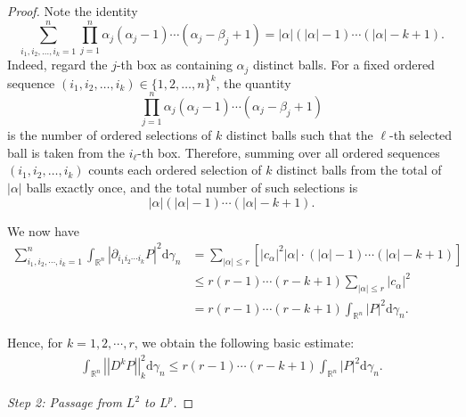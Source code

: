 \documentclass[12pt]{article}
\theoremstyle{plain}
\theoremstyle{definition}
\theoremstyle{remark}
\numberwithin{equation}{section}
\begin{document}
\begin{proof}
	Note the identity
	\[
	\sum_{i_{1},i_{2},\ldots,i_{k}=1}^{n}
	\prod_{j=1}^{n}
	\alpha_{j}(\alpha_{j}-1)\cdots(\alpha_{j}-\beta_{j}+1)
	=
	|\alpha|(|\alpha|-1)\cdots(|\alpha|-k+1).
	\]
	Indeed, regard the $j$-th box as containing $\alpha_j$ distinct balls.
	For a fixed ordered sequence
	$(i_1,i_2,\ldots,i_k)\in\{1,2,\ldots,n\}^k$,
	the quantity
	\[
	\prod_{j=1}^{n}
	\alpha_{j}(\alpha_{j}-1)\cdots(\alpha_{j}-\beta_{j}+1)
	\]
	is the number of ordered selections of $k$ distinct balls such that the
	$\ell$-th selected ball is taken from the $i_\ell$-th box.
	Therefore, summing over all ordered sequences
	$(i_1,i_2,\ldots,i_k)$ counts each ordered selection of $k$ distinct balls
	from the total of $|\alpha|$ balls exactly once, and the total number of such
	selections is
	\[
	|\alpha|(|\alpha|-1)\cdots(|\alpha|-k+1).
	\]

We now have
	$$\begin{aligned}\sum_{i_{1},i_{2},\cdots, i_{k}=1}^{n} \int_{\mathbb{R}^{n}} \left| \partial_{i_{1}i_{2}\cdots i_{k}} P \right|^{2} \mathrm{d} \gamma_{n}&=\sum_{\left| \alpha \right| \leqslant r} \left[ \left| c_{\alpha} \right|^{2} \left| \alpha \right| \cdot \left( \left| \alpha \right| -1 \right) \cdots \left( \left| \alpha \right| -k+1 \right) \right]\\ &\leqslant r\left( r-1 \right) \cdots \left( r-k+1 \right) \sum_{\left| \alpha \right| \leqslant r} \left| c_{\alpha} \right|^{2}\\ &=r\left( r-1 \right) \cdots \left( r-k+1 \right) \int_{\mathbb{R}^{n}} \left| P \right|^{2} \mathrm{d} \gamma_{n}.\end{aligned}$$
	
	Hence, for $k=1,2,\cdots ,r$, we obtain the following basic estimate:
	\begin{eqnarray}
		\int_{\mathbb{R}^{n}} \left| \left| D^{k}P \right| \right|_{k}^{2} \mathrm{d} \gamma_{n} \leqslant r\left( r-1 \right) \cdots \left( r-k+1 \right) \int_{\mathbb{R}^{n}} \left| P \right|^{2} \mathrm{d} \gamma_{n}.\label{1f1f3}
	\end{eqnarray}
	
\medskip\noindent\textit{Step 2: Passage from $L^2$ to $L^p$.}


\end{proof}
\end{document}
